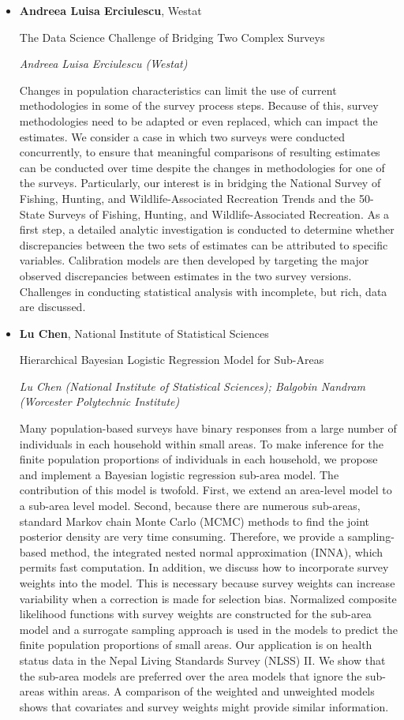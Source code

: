 \begin{itemize}
\item \textbf{Andreea Luisa Erciulescu}, Westat

The Data Science Challenge of Bridging Two Complex Surveys

\emph{\footnotesize Andreea Luisa Erciulescu (Westat)}

Changes in population characteristics can limit the use of current methodologies in some of the survey process steps. Because of this, survey methodologies need to be adapted or even replaced, which can impact the estimates.  We consider a case in which two surveys were conducted concurrently, to ensure that meaningful comparisons of resulting estimates can be conducted over time despite the changes in methodologies for one of the surveys. Particularly, our interest is in bridging the National Survey of Fishing, Hunting, and Wildlife-Associated Recreation Trends and the 50-State Surveys of Fishing, Hunting, and Wildlife-Associated Recreation. As a first step, a detailed analytic investigation is conducted to determine whether discrepancies between the two sets of estimates can be attributed to specific variables. Calibration models are then developed by targeting the major observed discrepancies between estimates in the two survey versions. Challenges in conducting statistical analysis with incomplete, but rich, data are discussed.

\item \textbf{Lu Chen}, National Institute of Statistical Sciences

Hierarchical Bayesian Logistic Regression Model for Sub-Areas

\emph{\footnotesize Lu Chen (National Institute of Statistical Sciences); Balgobin Nandram (Worcester Polytechnic Institute)}

Many population-based surveys have binary responses from a large number of individuals in each household within small areas. To make inference for the finite population proportions of individuals in each household, we propose and implement a Bayesian logistic regression sub-area model. The contribution of this model is twofold. First, we extend an area-level model to a sub-area level model. Second, because there are numerous sub-areas, standard Markov chain Monte Carlo (MCMC) methods to find the joint posterior density are very time consuming. Therefore, we provide a sampling-based method, the integrated nested normal approximation (INNA), which permits fast computation. In addition, we discuss how to incorporate survey weights into the model. This is necessary because survey weights can increase variability when a correction is made for selection bias. Normalized composite likelihood functions with survey weights are constructed for the sub-area model and a surrogate sampling approach is used in the models to predict the finite population proportions of small areas. Our application is on health status data in the Nepal Living Standards Survey (NLSS) II. We show that the sub-area models are preferred over the area models that ignore the sub-areas within areas. A comparison of the weighted and unweighted models shows that covariates and survey weights might provide similar information.


\end{itemize}
